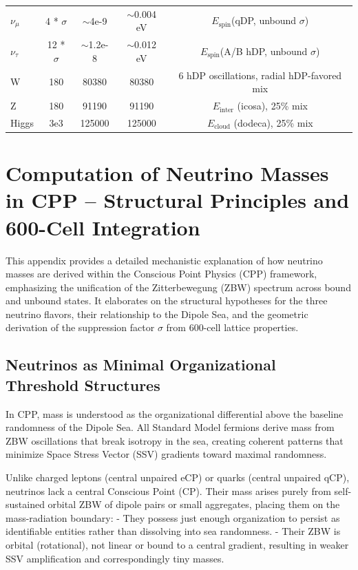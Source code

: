 \documentclass{article}
\begin{document}
\begin{landscape}
\begin{longtable}{lcccc}
$\nu_\mu$ & 4 * $\sigma$ & $\sim$4e-9 & $\sim$0.004 eV & $E_{\text{spin}}$(qDP, unbound $\sigma$) \\
$\nu_\tau$ & 12 * $\sigma$ & $\sim$1.2e-8 & $\sim$0.012 eV & $E_{\text{spin}}$(A/B hDP, unbound $\sigma$) \\
W & 180 & 80380 & 80380 & 6 hDP oscillations, radial hDP-favored mix \\
Z & 180 & 91190 & 91190 & $E_{\text{inter}}$ (icosa), 25\% mix \\
Higgs & 3e3 & 125000 & 125000 & $E_{\text{cloud}}$ (dodeca), 25\% mix \\
\bottomrule
\end{longtable}
\end{landscape}

\appendix
\section{Computation of Neutrino Masses in CPP -- Structural Principles and 600-Cell Integration}

This appendix provides a detailed mechanistic explanation of how neutrino masses are derived within the Conscious Point Physics (CPP) framework, emphasizing the unification of the Zitterbewegung (ZBW) spectrum across bound and unbound states. It elaborates on the structural hypotheses for the three neutrino flavors, their relationship to the Dipole Sea, and the geometric derivation of the suppression factor $\sigma$ from 600-cell lattice properties.

\subsection{Neutrinos as Minimal Organizational Threshold Structures}

In CPP, mass is understood as the organizational differential above the baseline randomness of the Dipole Sea. All Standard Model fermions derive mass from ZBW oscillations that break isotropy in the sea, creating coherent patterns that minimize Space Stress Vector (SSV) gradients toward maximal randomness.

Unlike charged leptons (central unpaired eCP) or quarks (central unpaired qCP), neutrinos lack a central Conscious Point (CP). Their mass arises purely from self-sustained orbital ZBW of dipole pairs or small aggregates, placing them on the mass-radiation boundary:
- They possess just enough organization to persist as identifiable entities rather than dissolving into sea randomness.
- Their ZBW is orbital (rotational), not linear or bound to a central gradient, resulting in weaker SSV amplification and correspondingly tiny masses.
\end{document}
